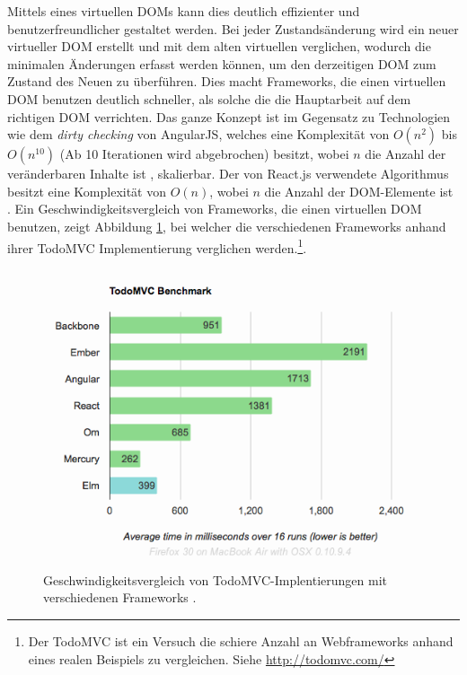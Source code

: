 \documentclass[12pt,twoside]{book}
\begin{document}
Mittels eines virtuellen DOMs kann dies deutlich effizienter und benutzerfreundlicher gestaltet werden. Bei jeder Zustandsänderung wird ein neuer virtueller DOM erstellt und mit dem alten virtuellen verglichen, wodurch die minimalen Änderungen erfasst werden können, um den derzeitigen DOM zum Zustand des Neuen zu überführen. Dies macht Frameworks, die einen virtuellen DOM benutzen deutlich schneller, als solche die die Hauptarbeit auf dem richtigen DOM verrichten. Das ganze Konzept ist im Gegensatz zu Technologien wie dem \textit{dirty checking} von AngularJS, welches eine Komplexität von $O(n^2)$ bis $O(n^10)$ (Ab 10 Iterationen wird abgebrochen) besitzt, wobei $n$ die Anzahl der veränderbaren Inhalte ist \cite{dirty}, skalierbar.
Der von React.js verwendete Algorithmus besitzt eine Komplexität von $O(n)$, wobei $n$ die Anzahl der DOM-Elemente ist \cite{reactreconciliation}.
Ein Geschwindigkeitsvergleich von Frameworks, die einen virtuellen DOM benutzen, zeigt Abbildung \ref{fig:elm}, bei welcher die verschiedenen Frameworks anhand ihrer TodoMVC Implementierung verglichen werden.\footnote{Der TodoMVC ist ein Versuch die schiere Anzahl an Webframeworks anhand eines realen Beispiels zu vergleichen. Siehe \url{http://todomvc.com/}}.

\begin{figure}[htbp]
    \centering
    \includegraphics[width=1.0\textwidth]{images/virtual_dom.png}
    \caption{Geschwindigkeitsvergleich von TodoMVC-Implentierungen mit verschiedenen Frameworks \cite{elm}.}
    \label{fig:elm}
\end{figure}
\end{document}
